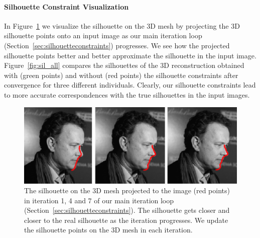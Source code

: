 \paragraph*{Silhouette Constraint Visualization} In Figure~\ref{fig:firstExample} we visualize the silhouette on the 3D mesh by projecting the 3D silhouette points onto an input image as our main iteration loop (Section~\ref{sec:silhouetteconstraints}) progresses. We see how the projected silhouette points better and better approximate the silhouette in the input image. Figure~\ref{fig:sil_all} compares the silhouettes of the 3D reconstruction obtained with (green points) and without (red points) the silhouette constraints after convergence for three different individuals. Clearly, our silhouette constraints lead to more accurate correspondences with the true silhouettes in the input images. 


\begin{figure}[t]
  \centering
  \includegraphics[width=1\linewidth]{figures/ite_th.jpg}
  \caption{\label{fig:firstExample}
           The silhouette on the 3D mesh projected to the image (red points) in iteration 1, 4 and 7 of our main iteration loop (Section~\ref{sec:silhouetteconstraints}). The silhouette gets closer and closer to the real silhouette as the iteration progresses. We update the silhouette points on the 3D mesh in each iteration.}
\end{figure}


